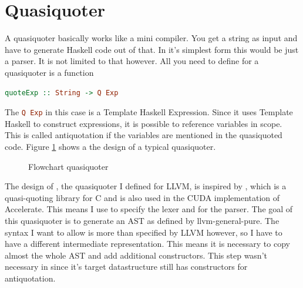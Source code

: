 \documentclass[a4paper,bibliography=totocnumbered,parskip,headsepline]{scrbook}
\begin{document}
\section{Quasiquoter}
A quasiquoter basically works like a mini compiler.
You get a string as input and have to generate Haskell code out of that.
In it's simplest form this would be just a parser.
It is not limited to that however.
All you need to define for a quasiquoter is a function
\begin{lstlisting}[language=haskell]
quoteExp :: String -> Q Exp
\end{lstlisting}
The \lstinline[language=haskell]!Q Exp! in this case is a Template Haskell Expression.
Since it uses Template Haskell to construct expressions, it is possible to reference variables in scope.
This is called antiquotation if the variables are mentioned in the quasiquoted code.
Figure \ref{fig:quasichart} shows a the design of a typical quasiquoter.

\begin{figure}
\begin{center}
\end{center}
\caption{Flowchart quasiquoter}
\label{fig:quasichart}
\end{figure}

The design of , the quasiquoter I defined for LLVM, is inspired by , which is a quasi-quoting library for C and is also used in the CUDA implementation of Accelerate.
This means I use  to specify the lexer and  for the parser.
The goal of this quasiquoter is to generate an AST as defined by llvm-general-pure.
The syntax I want to allow is more than specified by LLVM however, so I have to have a different intermediate representation.
This means it is necessary to copy almost the whole AST and add additional constructors.
This step wasn't necessary in  since it's target datastructure still has constructors for antiquotation.
\end{document}
